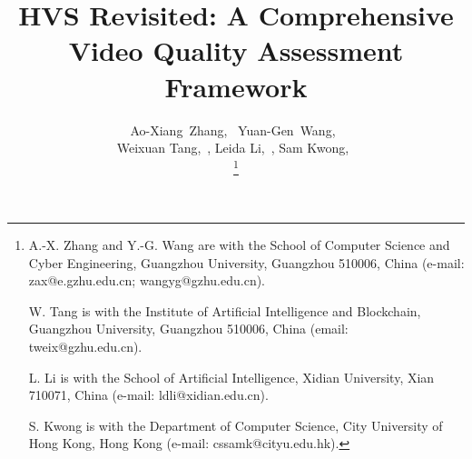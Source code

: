 \documentclass[journal]{IEEEtran}
\begin{document}
\title{HVS Revisited: A Comprehensive Video Quality Assessment Framework}

\author{Ao-Xiang~Zhang,~ Yuan-Gen~Wang,~\\
Weixuan Tang,~,
Leida Li,~, Sam Kwong,~

\thanks{


A.-X. Zhang and Y.-G. Wang are with the School of Computer Science and Cyber Engineering, Guangzhou University, Guangzhou 510006, China (e-mail: zax@e.gzhu.edu.cn; wangyg@gzhu.edu.cn).

W. Tang is with the Institute of Artificial Intelligence and Blockchain, Guangzhou University, Guangzhou 510006, China (email: tweix@gzhu.edu.cn).

L. Li is with the School of Artificial Intelligence, Xidian University, Xian 710071, China (e-mail: ldli@xidian.edu.cn).

S. Kwong is with the Department of Computer Science, City University of Hong Kong, Hong Kong (e-mail: cssamk@cityu.edu.hk).
}}

\maketitle
\end{document}
